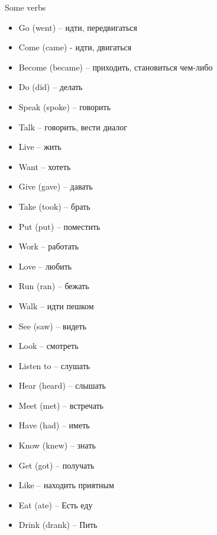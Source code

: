 \documentclass{tstextbook}
\begin{document}
	\begin{example}Some verbs
		\label{def:some_verbs}
		\begin{itemize}
			\item Go (went) -- идти, передвигаться
			\item Come (came) - идти, двигаться
			\item Become (became) -- приходить, становиться чем-либо
			\item Do (did) -- делать
			\item Speak (spoke) -- говорить
			\item Talk -- говорить, вести диалог	
			\item Live -- жить
			\item Want -- хотеть
			\item Give (gave) -- давать
			\item Take (took) -- брать
			\item Put (put) -- поместить
			\item Work -- работать
			\item Love -- любить
			\item Run (ran) -- бежать
			\item Walk -- идти пешком
			\item See (saw) -- видеть
			\item Look -- смотреть
			\item Listen to -- слушать
			\item Hear (heard) -- слышать
			\item Meet (met) -- встречать
			\item Have (had) -- иметь
			\item Know (knew) -- знать
			\item Get (got) -- получать
			\item Like -- находить приятным
			\item Eat (ate) -- Есть еду
			\item Drink (drank) -- Пить
		\end{itemize}
	\end{example}
\end{document}
